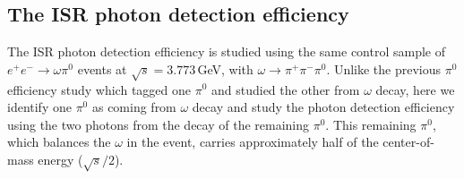 \subsection{The ISR photon detection efficiency}

The ISR photon detection efficiency is studied using the same control sample of $e^+e^- \to \omega \pi^0$ events at $\sqrt{s} = 3.773$\,GeV, with $\omega \to \pi^+\pi^-\pi^0$. Unlike the previous $\pi^0$ efficiency study which tagged one $\pi^0$ and studied the other from $\omega$ decay, here we identify one $\pi^0$ as coming from $\omega$ decay and study the photon detection efficiency using the two photons from the decay of the remaining $\pi^0$. This remaining $\pi^0$, which balances the $\omega$ in the event, carries approximately half of the center-of-mass energy ($\sqrt{s}/2$).

